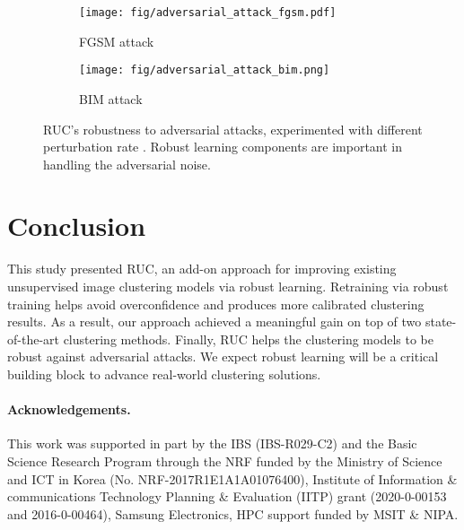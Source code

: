 \documentclass[final]{cvpr}
\newcommand{\model}{\textsf{RUC}}
\begin{document}
\begin{figure}[!h]
    \centering
    \begin{subfigure}[b]{.495\linewidth}
        \centering\captionsetup{width=1.0\linewidth}
        \texttt{[image: fig/adversarial\_attack\_fgsm.pdf]}
        \caption{FGSM attack}
    \end{subfigure}
    \begin{subfigure}[b]{.495\linewidth}
        \centering\captionsetup{width=1.0\linewidth}
        \texttt{[image: fig/adversarial\_attack\_bim.png]}
        \caption{BIM attack}
    \end{subfigure}
    \caption{\model{}'s robustness to adversarial attacks, experimented with different perturbation rate . Robust learning components are important in handling the adversarial noise.}
    \label{fig:adversarial-attack}
\end{figure}






 \vspace{-4mm}
\section{Conclusion}
This study presented \model{}, an add-on approach for improving existing unsupervised image clustering models via robust learning. Retraining via robust training helps avoid overconfidence and produces more calibrated clustering results. As a result, our approach achieved a meaningful gain on top of two state-of-the-art clustering methods. Finally, \model{} helps the clustering models to be robust against adversarial attacks. We expect robust learning will be a critical building block to advance real-world clustering solutions. 

\small{\paragraph{Acknowledgements.}
This work was supported in part by the IBS (IBS-R029-C2) and the Basic Science Research Program through the NRF funded by the Ministry of Science and ICT in Korea (No. NRF-2017R1E1A1A01076400),
Institute of Information \& communications Technology Planning \& Evaluation (IITP) grant  (2020-0-00153 and 2016-0-00464), Samsung Electronics, HPC support funded by MSIT \& NIPA.
}



\nocite{papernot2016distillation,warde201611} 
\newpage
\balance 
\end{document}
